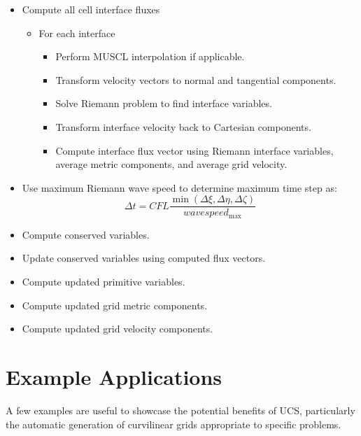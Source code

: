 \begin{itemize}
\item Compute all cell interface fluxes
  \begin{itemize}
  \item For each interface
    \begin{itemize}
    \item Perform MUSCL interpolation if applicable.
    \item Transform velocity vectors to normal and tangential components.
    \item Solve Riemann problem to find interface variables.
    \item Transform interface velocity back to Cartesian components.
    \item Compute interface flux vector using Riemann interface variables, average metric components, and average grid velocity.
    \end{itemize}
  \end{itemize}
\item Use maximum Riemann wave speed to determine maximum time step as:
\[\Delta t = CFL\frac{{\min \left( {\Delta \xi ,\Delta \eta ,\Delta \zeta } \right)}}{{wavespee{d_{\max }}}}\]
\item Compute conserved variables.
\item Update conserved variables using computed flux vectors.
\item Compute updated primitive variables.
\item Compute updated grid metric components.
\item Compute updated grid velocity components.
\end{itemize}

\section{Example Applications}
\label{sec:UCS-examples}

A few examples are useful to showcase the potential benefits of UCS, particularly the automatic generation of curvilinear grids appropriate to specific problems.

